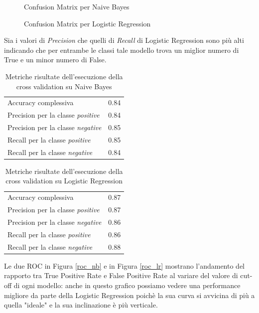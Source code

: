 \begin{figure}[H]
  \centering
  
  \caption{Confusion Matrix per Naive Bayes}
  \label{cm_nb}
\end{figure}

\begin{figure}[H]
  \centering
  
  \caption{Confusion Matrix per Logistic Regression}
  \label{cm_lr}
\end{figure}

\par
Sia i valori di \textit{Precision} che quelli di \textit{Recall} di Logistic Regression sono più alti indicando che per entrambe le classi tale modello trova un miglior numero di True e un minor numero di False.

\begin{table}[H]
\centering
  \begin{tabular}{l l} 
  Accuracy complessiva & 0.84\\
  Precision per la classe \textit{positive} & 0.84\\
  Precision per la classe \textit{negative} & 0.85\\
  Recall per la classe \textit{positive} & 0.85\\
  Recall per la classe \textit{negative} & 0.84\\
    \end{tabular}
    \caption{Metriche risultate dell'esecuzione della cross validation su Naive Bayes}
\end{table}

\begin{table}[H]
\centering
  \begin{tabular}{l l} 
  Accuracy complessiva & 0.87\\
  Precision per la classe \textit{positive} & 0.87\\
  Precision per la classe \textit{negative} & 0.86\\
  Recall per la classe \textit{positive} & 0.86\\
  Recall per la classe \textit{negative} & 0.88\\
    \end{tabular}
    \caption{Metriche risultate dell'esecuzione della cross validation su Logistic Regression}
\end{table}


\par
Le due ROC in Figura \ref{roc_nb} e in Figura \ref{roc_lr} mostrano l'andamento del rapporto tra True Positive Rate e False Positive Rate al variare del valore di cut-off di ogni modello: anche in questo grafico possiamo vedere una performance migliore da parte della Logistic Regression poichè la sua curva si avvicina di più a quella "ideale" e la sua inclinazione è più verticale.


